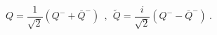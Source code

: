 \begin{equation}
Q = \frac{1}{\sqrt{2}} \left(Q^- + \bar{Q}^- \right)~~,~~
\widetilde{Q} = \frac{i}{\sqrt{2}} \left( Q^- - \bar{Q}^- \right)~.
\end{equation}

